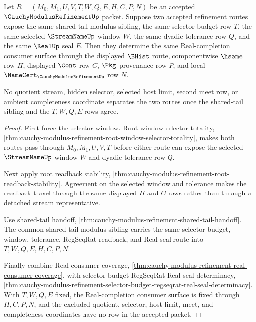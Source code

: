 \begin{theorem}
\label{thm:cauchy-modulus-refinement-shared-tail-selector-window-determinacy}
Let $R=(M_0,M_1,U,V,T,W,Q,E,H,C,P,N)$ be an accepted $\CauchyModulusRefinementUp$ packet. Suppose two accepted refinement routes expose the same shared-tail modulus sibling, the same selector-budget row $T$, the same selected $\StreamNameUp$ window $W$, the same dyadic tolerance row $Q$, and the same $\RealUp$ seal $E$. Then they determine the same Real-completion consumer surface through the displayed $\BHist$ route, componentwise $\hsame$ row $H$, displayed $\Cont$ row $C$, $\Pkg$ provenance row $P$, and local $\NameCert_{\CauchyModulusRefinementUp}$ row $N$.

No quotient stream, hidden selector, selected host limit, second meet row, or ambient completeness coordinate separates the two routes once the shared-tail sibling and the $T,W,Q,E$ rows agree.
\end{theorem}
\begin{proof}
First force the selector window. Root window-selector totality, \autoref{thm:cauchy-modulus-refinement-root-window-selector-totality}, makes both routes pass through $M_0,M_1,U,V,T$ before either route can expose the selected $\StreamNameUp$ window $W$ and dyadic tolerance row $Q$.

Next apply root readback stability, \autoref{thm:cauchy-modulus-refinement-root-readback-stability}. Agreement on the selected window and tolerance makes the readback travel through the same displayed $H$ and $C$ rows rather than through a detached stream representative.

Use shared-tail handoff, \autoref{thm:cauchy-modulus-refinement-shared-tail-handoff}. The common shared-tail modulus sibling carries the same selector-budget, window, tolerance, RegSeqRat readback, and Real seal route into $T,W,Q,E,H,C,P,N$.

Finally combine Real-consumer coverage, \autoref{thm:cauchy-modulus-refinement-real-consumer-coverage}, with selector-budget RegSeqRat Real-seal determinacy, \autoref{thm:cauchy-modulus-refinement-selector-budget-regseqrat-real-seal-determinacy}. With $T,W,Q,E$ fixed, the Real-completion consumer surface is fixed through $H,C,P,N$, and the excluded quotient, selector, host-limit, meet, and completeness coordinates have no row in the accepted packet.
\end{proof}

